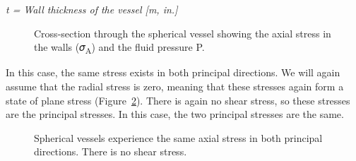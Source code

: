 \documentclass[
  letterpaper,
  DIV=11,
  numbers=noendperiod]{scrreprt}
\theoremstyle{definition}
\theoremstyle{remark}
\begin{document}
\emph{t = Wall thickness of the vessel {[}m, in.{]}}

\begin{figure}


\caption{\label{fig-13.7}Cross-section through the spherical vessel
showing the axial stress in the walls (𝜎\textsubscript{A}) and the fluid
pressure P.}

\end{figure}%

In this case, the same stress exists in both principal directions. We
will again assume that the radial stress is zero, meaning that these
stresses again form a state of plane stress (Figure~\ref{fig-13.8}).
There is again no shear stress, so these stresses are the principal
stresses. In this case, the two principal stresses are the same.

\begin{figure}


\caption{\label{fig-13.8}Spherical vessels experience the same axial
stress in both principal directions. There is no shear stress.}

\end{figure}%
\end{document}
